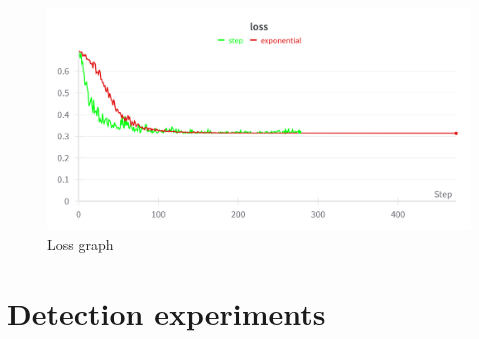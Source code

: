 \begin{figure}[ht!]
    \centering
    \includegraphics[width=1\linewidth]{figures/Figure24.png}
    \caption{Loss graph}
    \label{fig:fig22}
\end{figure}
\section{Detection experiments}